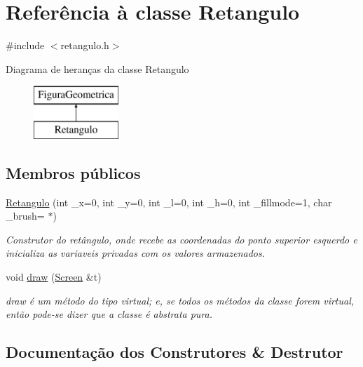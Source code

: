 \hypertarget{class_retangulo}{}\section{Referência à classe Retangulo}
\label{class_retangulo}


{\ttfamily \#include $<$retangulo.\+h$>$}

Diagrama de heranças da classe Retangulo\begin{figure}[H]
\begin{center}
\leavevmode
\includegraphics[height=2.000000cm]{class_retangulo}
\end{center}
\end{figure}
\subsection*{Membros públicos}
\begin{DoxyCompactItemize}
\item 
\hyperlink{class_retangulo_a93eeef9b155c5bb9f19d3c8d4013b43c}{Retangulo} (int \+\_\+x=0, int \+\_\+y=0, int \+\_\+l=0, int \+\_\+h=0, int \+\_\+fillmode=1, char \+\_\+brush=\textquotesingle{} $\ast$\textquotesingle{})
\begin{DoxyCompactList}\small\item\em Construtor do retângulo, onde recebe as coordenadas do ponto superior esquerdo e inicializa as variaveis privadas com os valores armazenados. \end{DoxyCompactList}\item 
void \hyperlink{class_retangulo_ac088dd6d3f4f3d3f80363a868c2e74f1}{draw} (\hyperlink{class_screen}{Screen} \&t)
\begin{DoxyCompactList}\small\item\em draw é um método do tipo virtual; e, se todos os métodos da classe forem virtual, então pode-\/se dizer que a classe é abstrata pura. \end{DoxyCompactList}\end{DoxyCompactItemize}


\subsection{Documentação dos Construtores \& Destrutor}
\mbox{\label{class_retangulo_a93eeef9b155c5bb9f19d3c8d4013b43c}} 
